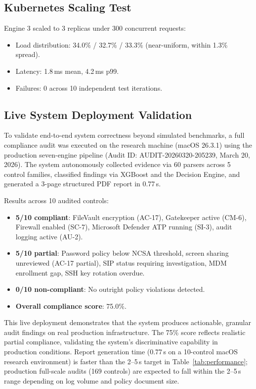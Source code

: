 \documentclass[futureinternet,article,submit,pdftex,moreauthors]{Definitions/mdpi}
\begin{document}
\subsection{Kubernetes Scaling Test}

Engine 3 scaled to 3 replicas under 300 concurrent requests:
\begin{itemize}
\item Load distribution: 34.0\% / 32.7\% / 33.3\% (near-uniform, within 1.3\% spread).
\item Latency: 1.8\,ms mean, 4.2\,ms p99.
\item Failures: 0 across 10 independent test iterations.
\end{itemize}

\subsection{Live System Deployment Validation}
\label{sec:live_deployment}

To validate end-to-end system correctness beyond simulated benchmarks, a full compliance audit
was executed on the research machine (macOS 26.3.1) using the production seven-engine pipeline
(Audit ID: AUDIT-20260320-205239, March 20, 2026). The system autonomously collected evidence
via 60 parsers across 5 control families, classified findings via XGBoost and the Decision
Engine, and generated a 3-page structured PDF report in 0.77\,s.

Results across 10 audited controls:
\begin{itemize}
\item \textbf{5/10 compliant}: FileVault encryption (AC-17), Gatekeeper active (CM-6),
Firewall enabled (SC-7), Microsoft Defender ATP running (SI-3), audit logging active (AU-2).
\item \textbf{5/10 partial}: Password policy below NCSA threshold, screen sharing unreviewed
(AC-17 partial), SIP status requiring investigation, MDM enrollment gap, SSH key rotation
overdue.
\item \textbf{0/10 non-compliant}: No outright policy violations detected.
\item \textbf{Overall compliance score}: 75.0\%.
\end{itemize}

This live deployment demonstrates that the system produces actionable, granular audit findings
on real production infrastructure. The 75\% score reflects realistic partial compliance,
validating the system's discriminative capability in production conditions. Report generation time (0.77\,s on a 10-control macOS research environment) is faster than the 2--5\,s target in Table~\ref{tab:performance}; production full-scale audits (169 controls) are expected to fall within the 2--5\,s range depending on log volume and policy document size.
\end{document}
